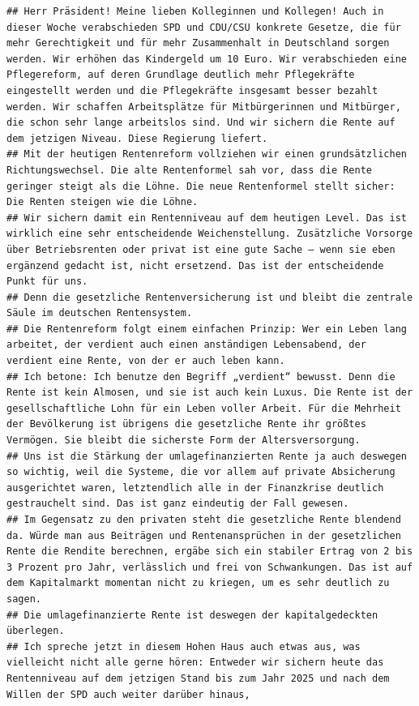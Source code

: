 \documentclass[oneside, 12pt]{scrbook}
\theoremstyle{definition}
\theoremstyle{definition}
\theoremstyle{definition}
\theoremstyle{remark}
\begin{document}
\begin{verbatim}
## Herr Präsident! Meine lieben Kolleginnen und Kollegen! Auch in dieser Woche verabschieden SPD und CDU/CSU konkrete Gesetze, die für mehr Gerechtigkeit und für mehr Zusammenhalt in Deutschland sorgen werden. Wir erhöhen das Kindergeld um 10 Euro. Wir verabschieden eine Pflegereform, auf deren Grundlage deutlich mehr Pflegekräfte eingestellt werden und die Pflegekräfte insgesamt besser bezahlt werden. Wir schaffen Arbeitsplätze für Mitbürgerinnen und Mitbürger, die schon sehr lange arbeitslos sind. Und wir sichern die Rente auf dem jetzigen Niveau. Diese Regierung liefert. 
## Mit der heutigen Rentenreform vollziehen wir einen grundsätzlichen Richtungswechsel. Die alte Rentenformel sah vor, dass die Rente geringer steigt als die Löhne. Die neue Rentenformel stellt sicher: Die Renten steigen wie die Löhne. 
## Wir sichern damit ein Rentenniveau auf dem heutigen Level. Das ist wirklich eine sehr entscheidende Weichenstellung. Zusätzliche Vorsorge über Betriebsrenten oder privat ist eine gute Sache – wenn sie eben ergänzend gedacht ist, nicht ersetzend. Das ist der entscheidende Punkt für uns. 
## Denn die gesetzliche Rentenversicherung ist und bleibt die zentrale Säule im deutschen Rentensystem. 
## Die Rentenreform folgt einem einfachen Prinzip: Wer ein Leben lang arbeitet, der verdient auch einen anständigen Lebensabend, der verdient eine Rente, von der er auch leben kann. 
## Ich betone: Ich benutze den Begriff „verdient“ bewusst. Denn die Rente ist kein Almosen, und sie ist auch kein Luxus. Die Rente ist der gesellschaftliche Lohn für ein Leben voller Arbeit. Für die Mehrheit der Bevölkerung ist übrigens die gesetzliche Rente ihr größtes Vermögen. Sie bleibt die sicherste Form der Altersversorgung. 
## Uns ist die Stärkung der umlagefinanzierten Rente ja auch deswegen so wichtig, weil die Systeme, die vor allem auf private Absicherung ausgerichtet waren, letztendlich alle in der Finanzkrise deutlich gestrauchelt sind. Das ist ganz eindeutig der Fall gewesen. 
## Im Gegensatz zu den privaten steht die gesetzliche Rente blendend da. Würde man aus Beiträgen und Rentenansprüchen in der gesetzlichen Rente die Rendite berechnen, ergäbe sich ein stabiler Ertrag von 2 bis 3 Prozent pro Jahr, verlässlich und frei von Schwankungen. Das ist auf dem Kapitalmarkt momentan nicht zu kriegen, um es sehr deutlich zu sagen. 
## Die umlagefinanzierte Rente ist deswegen der kapitalgedeckten überlegen. 
## Ich spreche jetzt in diesem Hohen Haus auch etwas aus, was vielleicht nicht alle gerne hören: Entweder wir sichern heute das Rentenniveau auf dem jetzigen Stand bis zum Jahr 2025 und nach dem Willen der SPD auch weiter darüber hinaus, 

\end{verbatim}
\end{document}
